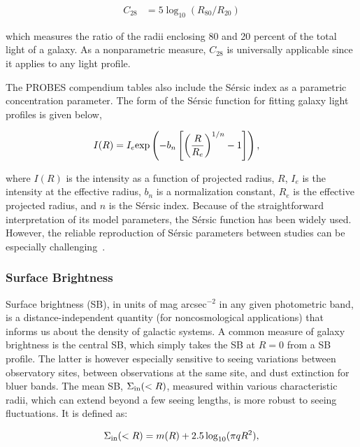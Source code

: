 \documentclass[twocolumn]{aastex631}
\begin{document}
\begin{eqnarray}
    C_{28} &= 5\log_{10}(R_{80}/R_{20})\label{equ:c28}
\end{eqnarray}

which measures the ratio of the radii enclosing 80 and 20 percent of the total light of a galaxy.
As a nonparametric measure, $C_{28}$ is universally applicable since it applies to any light profile.

The PROBES compendium tables also include the S{\'e}rsic index \citep{sersic1968} as a parametric concentration parameter.
The form of the S{\'e}rsic function for fitting galaxy light profiles is given below, 

\begin{eqnarray}
    I(R) &= I_e{\rm exp}\left(-b_n\left[\left(\frac{R}{R_e}\right)^{1/n}-1\right]\right),\label{equ:sersic}
\end{eqnarray}

where $I(R)$ is the intensity as a function of projected radius, $R$, $I_e$ is the intensity at the effective radius, $b_n$ is a normalization constant, $R_e$ is the effective projected radius, and $n$ is the S{\'e}rsic index.
Because of the straightforward interpretation of its model parameters, the S{\'e}rsic function has been widely used. 
However, the reliable reproduction of S{\'e}rsic parameters between studies can be especially challenging~\citep{Arora2021,Sonnenfeld2022}.

\subsubsection{Surface Brightness}\label{sec:evalsurfacedensity}

Surface brightness (SB), in units of mag arcsec$^{-2}$ in any given photometric band, is a distance-independent quantity (for noncosmological applications) that informs us about the density of galactic systems. 
A common measure of galaxy brightness is the central SB, which simply takes the SB at $R=0$ from a SB profile.
The latter is however especially sensitive to seeing variations between observatory sites, between observations at the same site, and dust extinction for bluer bands.  
The mean SB, $\Sigma_{\rm in}(<R)$, measured within various characteristic radii, which can extend beyond a few seeing lengths, is more robust to seeing fluctuations.
It is defined as: 

\begin{equation}
    \Sigma_{\rm in}(<R) = m(R) + 2.5\log_{10}(\pi qR^2),
\end{equation}
\end{document}

